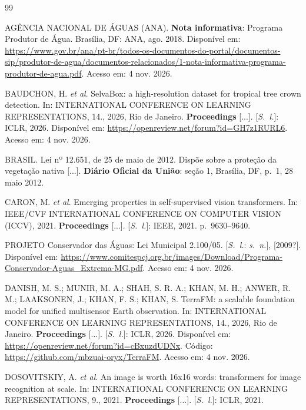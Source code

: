 \documentclass[conference]{IEEEtran}
\begin{document}
\renewcommand{\refname}{Referências}
\begin{thebibliography}{99}
\footnotesize

 AGÊNCIA NACIONAL DE ÁGUAS (ANA). \textbf{Nota informativa}: Programa Produtor de Água. Brasília, DF: ANA, ago. 2018. Disponível em: \url{https://www.gov.br/ana/pt-br/todos-os-documentos-do-portal/documentos-sip/produtor-de-agua/documentos-relacionados/1-nota-informativa-programa-produtor-de-agua.pdf}. Acesso em: 4 nov. 2026.

 BAUDCHON, H. \textit{et al}. SelvaBox: a high-resolution dataset for tropical tree crown detection. In: INTERNATIONAL CONFERENCE ON LEARNING REPRESENTATIONS, 14., 2026, Rio de Janeiro. \textbf{Proceedings} [...]. [\textit{S.~l.}]: ICLR, 2026. Disponível em: \url{https://openreview.net/forum?id=GH7z1RURL6}. Acesso em: 4 nov. 2026.

 BRASIL. Lei nº 12.651, de 25 de maio de 2012. Dispõe sobre a proteção da vegetação nativa [...]. \textbf{Diário Oficial da União}: seção 1, Brasília, DF, p.~1, 28 maio 2012.

 CARON, M. \textit{et al}. Emerging properties in self-supervised vision transformers. In: IEEE/CVF INTERNATIONAL CONFERENCE ON COMPUTER VISION (ICCV), 2021. \textbf{Proceedings} [...]. [\textit{S.~l.}]: IEEE, 2021. p.~9630--9640.

 PROJETO Conservador das Águas: Lei Municipal 2.100/05. [\textit{S.~l.}: \textit{s.~n.}], [2009?]. Disponível em: \url{https://www.comitespcj.org.br/images/Download/Programa-Conservador-Aguas_Extrema-MG.pdf}. Acesso em: 4 nov. 2026.

 DANISH, M. S.; MUNIR, M. A.; SHAH, S. R. A.; KHAN, M. H.; ANWER, R. M.; LAAKSONEN, J.; KHAN, F. S.; KHAN, S. TerraFM: a scalable foundation model for unified multisensor Earth observation. In: INTERNATIONAL CONFERENCE ON LEARNING REPRESENTATIONS, 14., 2026, Rio de Janeiro. \textbf{Proceedings} [...]. [\textit{S.~l.}]: ICLR, 2026. Disponível em: \url{https://openreview.net/forum?id=cBxuzdUDNx}. Código: \url{https://github.com/mbzuai-oryx/TerraFM}. Acesso em: 4 nov. 2026.

 DOSOVITSKIY, A. \textit{et al}. An image is worth 16x16 words: transformers for image recognition at scale. In: INTERNATIONAL CONFERENCE ON LEARNING REPRESENTATIONS, 9., 2021. \textbf{Proceedings} [...]. [\textit{S.~l.}]: ICLR, 2021.


\end{thebibliography}
\end{document}
